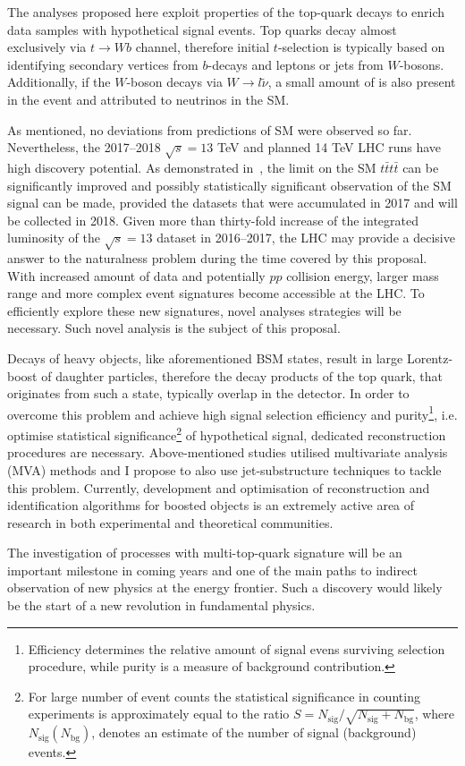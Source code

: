 \textcolor{\mycolor}{
The analyses proposed here exploit properties of the top-quark decays to enrich data samples with hypothetical signal events. Top quarks decay almost exclusively via $t \rightarrow Wb$ channel, therefore initial $t$-selection is typically based on identifying secondary vertices from $b$-decays and leptons or jets from $W$-bosons. Additionally, if the $W$-boson decays via $W\rightarrow l\tilde{\nu}$, a small amount of \misspt is also present in the event and attributed to neutrinos in the SM. }

\textcolor{\mycolor}{
As mentioned, no deviations from predictions of SM were observed so far. Nevertheless, the 2017--2018 $\sqrt{s}=13$ TeV and planned 14 TeV LHC runs have high discovery potential. As demonstrated in~\cite{Sirunyan:2017tep}, the limit on the SM $t\bar{t}t\bar{t}$ can be significantly improved and possibly statistically significant observation of the SM signal can be made, provided the datasets that were accumulated in 2017 and will be collected in 2018. 
Given more than thirty-fold increase of the integrated luminosity of the $\sqrt{s}=13$ dataset in 2016--2017, the LHC may provide a decisive answer to the naturalness problem during the time covered by this proposal. With increased amount of data and potentially $pp$ collision energy, larger mass range and more complex event signatures become accessible at the LHC. To efficiently explore these new signatures, novel analyses strategies will be necessary. Such novel analysis is the subject of this proposal.}

\textcolor{\mycolor}{
Decays of heavy objects, like  aforementioned BSM states, result in large Lorentz-boost of daughter particles, therefore the decay products of the top quark, that originates from such a state, typically overlap in the detector. In order to overcome this problem and achieve high signal selection efficiency and purity\footnote{Efficiency determines the relative amount of signal evens surviving selection procedure, while purity is a measure of background contribution.}, i.e. optimise statistical significance\footnote{For large number of event counts the statistical significance in counting experiments is approximately equal to the ratio $S=N_{\mathrm{sig}}/\sqrt{N_{\mathrm{sig}}+N_{\mathrm{bg}}}$, where $N_{\mathrm{sig}}\left(N_{\mathrm{bg}}\right)$, denotes an estimate of the number of signal (background) events.} of hypothetical signal, dedicated reconstruction procedures are necessary. Above-mentioned studies utilised multivariate analysis (MVA) methods and I propose to also use jet-substructure techniques to tackle this problem. Currently, development and optimisation of reconstruction and identification algorithms for boosted objects is an extremely active area of research in both experimental and theoretical communities.}

\textcolor{\mycolor}{
The investigation of processes with multi-top-quark signature will be an important milestone in coming years and one of the main paths to indirect observation of new physics at the energy frontier. Such a discovery would likely be the start of a new revolution in fundamental physics. }